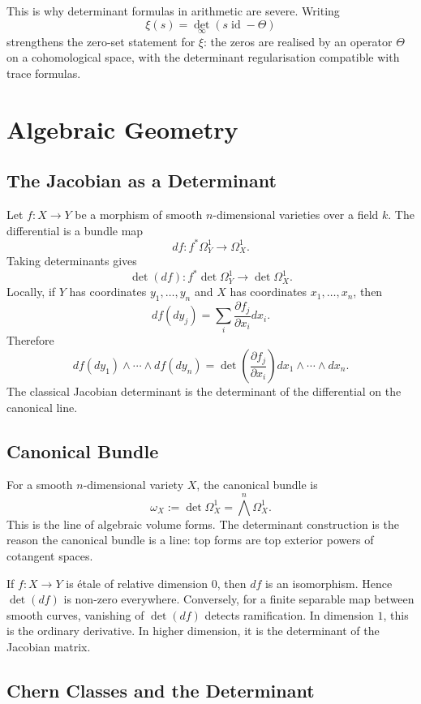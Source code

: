 \documentclass[11pt]{memoir}
\providecommand{\id}{\operatorname{id}}
\begin{document}
This is why determinant formulas in arithmetic are severe. Writing
\[
  \xi(s)=\det_\infty(s\id-\Theta)
\]
strengthens the zero-set statement for \(\xi\): the zeros are realised
by an operator \(\Theta\) on a cohomological space, with the
determinant regularisation compatible with trace formulas.

\chapter{Algebraic Geometry}
\label{ch:algebraic-geometry}

\section{The Jacobian as a Determinant}
\label{sec:jacobian}

Let \(f:X\to Y\) be a morphism of smooth \(n\)-dimensional varieties
over a field \(k\). The differential is a bundle map
\[
  df:f^*\Omega^1_Y\to\Omega^1_X.
\]
Taking determinants gives
\[
  \det(df):
  f^*\det\Omega^1_Y\longrightarrow \det\Omega^1_X.
\]
Locally, if \(Y\) has coordinates \(y_1,\dots,y_n\) and \(X\) has
coordinates \(x_1,\dots,x_n\), then
\[
  df(dy_j)=\sum_i\frac{\partial f_j}{\partial x_i}dx_i.
\]
Therefore
\[
  df(dy_1)\wedge\cdots\wedge df(dy_n)
  =
  \det\left(\frac{\partial f_j}{\partial x_i}\right)
  dx_1\wedge\cdots\wedge dx_n.
\]
The classical Jacobian determinant is the determinant of the
differential on the canonical line.

\section{Canonical Bundle}
\label{sec:canonical-bundle}

For a smooth \(n\)-dimensional variety \(X\), the canonical bundle is
\[
  \omega_X:=\det\Omega^1_X=\bigwedge^n\Omega^1_X.
\]
This is the line of algebraic volume forms. The determinant
construction is the reason the canonical bundle is a line: top
forms are top exterior powers of cotangent spaces.

If \(f:X\to Y\) is étale of relative dimension \(0\), then \(df\) is
an isomorphism. Hence \(\det(df)\) is non-zero everywhere. Conversely,
for a finite separable map between smooth curves, vanishing of
\(\det(df)\) detects ramification. In dimension \(1\), this is the
ordinary derivative. In higher dimension, it is the determinant of the
Jacobian matrix.

\section{Chern Classes and the Determinant}
\label{sec:chern-det}
\end{document}
